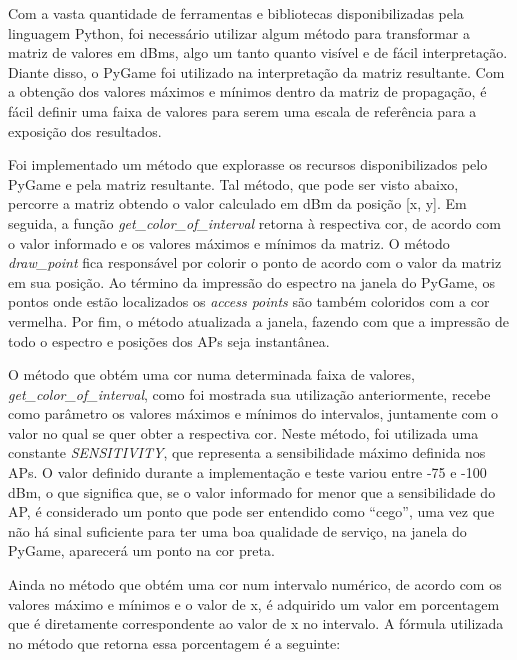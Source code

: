 \documentclass[
	12pt,				%
	openright,			%
	twoside,			%
	a4paper,			%
	english,			%
	french,				%
	spanish,			%
	brazil				%
	]{abntex2}
\begin{document}
Com a vasta quantidade de ferramentas e bibliotecas disponibilizadas pela linguagem Python, foi necessário utilizar algum método para transformar a matriz de valores em dBms,  algo um tanto quanto visível e de fácil interpretação. Diante disso, o PyGame foi utilizado na interpretação da matriz resultante. Com a obtenção dos valores máximos e mínimos dentro da matriz de propagação, é fácil definir uma faixa de valores para serem uma escala de referência para a exposição dos resultados. 

Foi implementado um método que explorasse os recursos disponibilizados pelo PyGame e pela matriz resultante. Tal método, que pode ser visto abaixo, percorre a matriz obtendo o valor calculado em dBm da posição [x, y]. Em seguida, a função \textit{get\_color\_of\_interval} retorna à respectiva cor, de acordo com o valor informado e os valores máximos e mínimos da matriz. O método \textit{draw\_point} fica responsável por colorir o ponto de acordo com o valor da matriz em sua posição. Ao término da impressão do espectro na janela do PyGame, os pontos onde estão localizados os \textit{access points} são também coloridos com a cor vermelha. Por fim, o método atualizada a janela, fazendo com que a impressão de todo o espectro e posições dos APs seja instantânea.





O método que obtém uma cor numa determinada faixa de valores, \textit{get\_color\_of\_interval}, como foi mostrada sua utilização anteriormente, recebe como parâmetro os valores máximos e mínimos do intervalos, juntamente com o valor no qual se quer obter a respectiva cor. Neste método, foi utilizada uma constante \textit{SENSITIVITY}, que representa a sensibilidade máximo definida nos APs. O valor definido durante a implementação e teste variou entre -75 e -100 dBm, o que significa que, se o valor informado for menor que a sensibilidade do AP, é considerado um ponto que pode ser entendido como “cego”, uma vez que não há sinal suficiente para ter uma boa qualidade de serviço, na janela do PyGame, aparecerá um ponto na cor preta.

Ainda no método que obtém uma cor num intervalo numérico, de acordo com os valores máximo e mínimos e o valor de x, é adquirido um valor em porcentagem que é diretamente correspondente ao valor de x no intervalo. A fórmula utilizada no método que retorna essa porcentagem é a seguinte:


\end{document}
